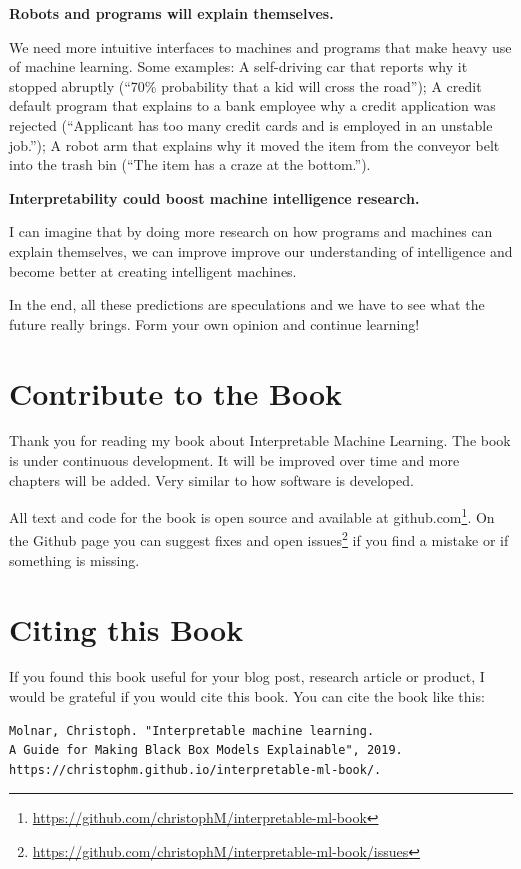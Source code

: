 \documentclass[
  12pt,
]{krantz}
\renewcommand{\href}[2]{#2\footnote{\url{#1}}}
\begin{document}
\textbf{Robots and programs will explain themselves.}

We need more intuitive interfaces to machines and programs that make heavy use of machine learning.
Some examples:
A self-driving car that reports why it stopped abruptly (``70\% probability that a kid will cross the road'');
A credit default program that explains to a bank employee why a credit application was rejected (``Applicant has too many credit cards and is employed in an unstable job.'');
A robot arm that explains why it moved the item from the conveyor belt into the trash bin (``The item has a craze at the bottom.'').

\textbf{Interpretability could boost machine intelligence research.}

I can imagine that by doing more research on how programs and machines can explain themselves, we can improve improve our understanding of intelligence and become better at creating intelligent machines.

In the end, all these predictions are speculations and we have to see what the future really brings.
Form your own opinion and continue learning!

\hypertarget{contribute}{%
\chapter{Contribute to the Book}\label{contribute}}

Thank you for reading my book about Interpretable Machine Learning.
The book is under continuous development.
It will be improved over time and more chapters will be added.
Very similar to how software is developed.

All text and code for the book is open source and \href{https://github.com/christophM/interpretable-ml-book}{available at github.com}.
On the Github page you can suggest fixes and \href{https://github.com/christophM/interpretable-ml-book/issues}{open issues} if you find a mistake or if something is missing.

\hypertarget{cite}{%
\chapter{Citing this Book}\label{cite}}

If you found this book useful for your blog post, research article or product, I would be grateful if you would cite this book.
You can cite the book like this:

\begin{verbatim}
Molnar, Christoph. "Interpretable machine learning.
A Guide for Making Black Box Models Explainable", 2019.
https://christophm.github.io/interpretable-ml-book/.
\end{verbatim}
\end{document}
